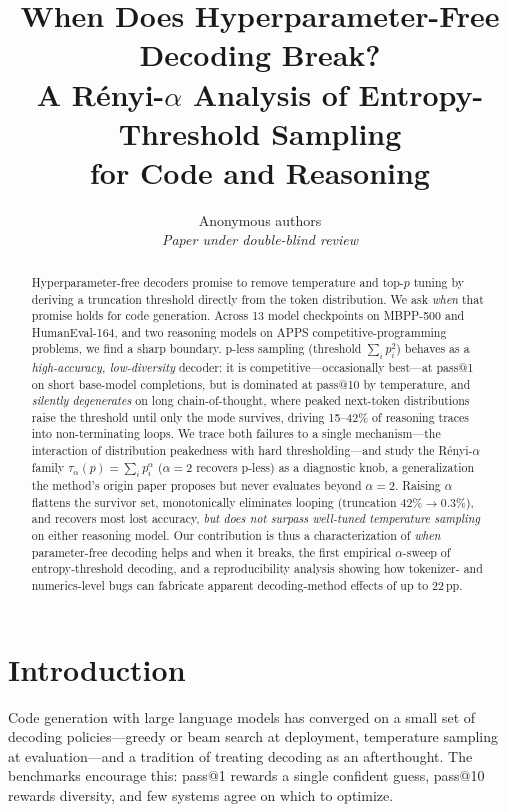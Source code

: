 \documentclass[11pt]{article}                       %
\title{When Does Hyperparameter-Free Decoding Break?\\
A R\'enyi-$\alpha$ Analysis of Entropy-Threshold Sampling\\ for Code and Reasoning}
\author{Anonymous authors\\ \textit{Paper under double-blind review}}
\date{}
\newcommand{\tsum}{\ensuremath{\textstyle\sum}}
\begin{document}
\maketitle

\begin{abstract}
Hyperparameter-free decoders promise to remove temperature and top-$p$ tuning by deriving a
truncation threshold directly from the token distribution. We ask \emph{when} that promise holds for
code generation. Across 13 model checkpoints on MBPP-500 and HumanEval-164, and two reasoning models
on APPS competitive-programming problems, we find a sharp boundary. p-less sampling
(threshold $\tsum_i p_i^2$) behaves as a \emph{high-accuracy, low-diversity} decoder: it is
competitive---occasionally best---at pass@1 on short base-model completions, but is dominated at
pass@10 by temperature, and \emph{silently degenerates} on long chain-of-thought, where peaked
next-token distributions raise the threshold until only the mode survives, driving 15--42\% of
reasoning traces into non-terminating loops. We trace both failures to a single mechanism---the
interaction of distribution peakedness with hard thresholding---and study the R\'enyi-$\alpha$ family
$\tau_\alpha(p)=\tsum_i p_i^\alpha$ ($\alpha=2$ recovers p-less) as a diagnostic knob, a
generalization the method's origin paper proposes but never evaluates beyond $\alpha=2$. Raising
$\alpha$ flattens the survivor set, monotonically eliminates looping (truncation $42\%\!\to\!0.3\%$),
and recovers most lost accuracy, \emph{but does not surpass well-tuned temperature sampling} on either
reasoning model. Our contribution is thus a characterization of \emph{when} parameter-free decoding
helps and when it breaks, the first empirical $\alpha$-sweep of entropy-threshold decoding, and a
reproducibility analysis showing how tokenizer- and numerics-level bugs can fabricate apparent
decoding-method effects of up to 22\,pp.
\end{abstract}

\section{Introduction}\label{sec:intro}
Code generation with large language models has converged on a small set of decoding policies---greedy
or beam search at deployment, temperature sampling at evaluation---and a tradition of treating
decoding as an afterthought. The benchmarks encourage this: pass@1 rewards a single confident guess,
pass@10 rewards diversity, and few systems agree on which to optimize.
\end{document}
